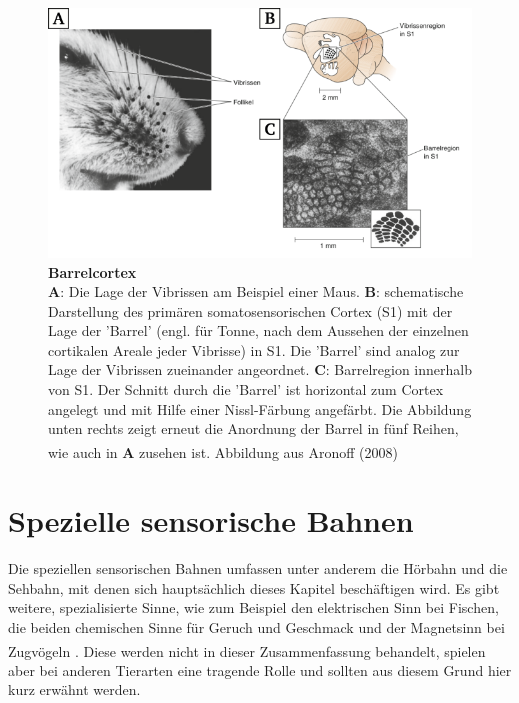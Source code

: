 \documentclass[12pt,a4paper,pdftex]{article}
\begin{document}
\begin{figure}[H]
    \centering
    \includegraphics[width = \textwidth] {pictures/somatosensory/barrelcortex.png}
    \caption[Barrelcortex]{\textbf{Barrelcortex}\\
    \textbf{A}: Die Lage der Vibrissen am Beispiel einer Maus. \textbf{B}: schematische Darstellung des primären somatosensorischen Cortex (S1) mit der Lage der 'Barrel' (engl. für Tonne, nach dem Aussehen der einzelnen cortikalen Areale jeder Vibrisse) in S1. Die 'Barrel' sind analog zur Lage der Vibrissen zueinander angeordnet. \textbf{C}: Barrelregion innerhalb von S1. Der Schnitt durch die 'Barrel' ist horizontal zum Cortex angelegt und mit Hilfe einer Nissl-Färbung angefärbt. Die Abbildung unten rechts zeigt erneut die Anordnung der Barrel in fünf Reihen, wie auch in \textbf{A} zusehen ist. Abbildung aus Aronoff (2008)
    \textsuperscript{\cite{barrelcortex2008}}}
    \label{fig:barrelcortex}
\end{figure}


\newpage
\section{Spezielle sensorische Bahnen}
\label{sec:spezsens}
Die speziellen sensorischen Bahnen umfassen unter anderem die Hörbahn   und die Sehbahn, mit denen sich hauptsächlich dieses Kapitel beschäftigen wird. Es gibt weitere, spezialisierte Sinne, wie zum Beispiel den elektrischen Sinn bei Fischen, die beiden chemischen Sinne für Geruch und Geschmack und der Magnetsinn bei Zugvögeln \textsuperscript{\cite{smith2008biology}}. Diese werden nicht in dieser Zusammenfassung behandelt, spielen aber bei anderen Tierarten eine tragende Rolle und sollten aus diesem Grund hier kurz erwähnt werden.
\end{document}
